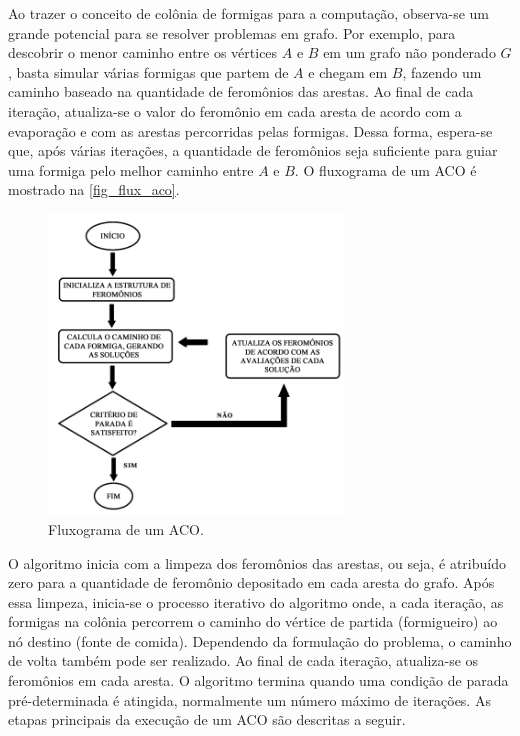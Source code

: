 Ao trazer o conceito de colônia de formigas para a computação, observa-se um grande potencial para se resolver problemas em grafo. Por exemplo, para descobrir o menor caminho entre os vértices $A$ e $B$ em um grafo não ponderado $G$, basta simular várias formigas que partem de $A$ e chegam em $B$, fazendo um caminho baseado na quantidade de feromônios das arestas. Ao final de cada iteração, atualiza-se o valor do feromônio em cada aresta de acordo com a evaporação e com as arestas percorridas pelas formigas. Dessa forma, espera-se que, após várias iterações, a quantidade de feromônios seja suficiente para guiar uma formiga pelo melhor caminho entre $A$ e $B$. O fluxograma de um ACO é mostrado na \autoref{fig_flux_aco}.

\begin{figure}[!htbp]
	\centering
	\includegraphics[width=0.7\textwidth]{cap_otimizacao-bio/figs/aco-flux.png}
	\caption{\label{fig_flux_aco}Fluxograma de um ACO.}
\end{figure}

O algoritmo inicia com a limpeza dos feromônios das arestas, ou seja, é atribuído zero para a quantidade de feromônio depositado em cada aresta do grafo. Após essa limpeza, inicia-se o processo iterativo do algoritmo onde, a cada iteração, as formigas na colônia percorrem o caminho do vértice de partida (formigueiro) ao nó destino (fonte de comida). Dependendo da formulação do problema, o caminho de volta também pode ser realizado. Ao final de cada iteração, atualiza-se os feromônios em cada aresta. O algoritmo termina quando uma condição de parada pré-determinada é atingida, normalmente um número máximo de iterações. As etapas principais da execução de um ACO são descritas a seguir.

